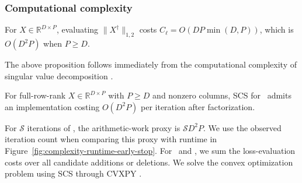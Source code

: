 \subsubsection{Computational complexity}

\begin{proposition}
\label{prop:pseudoinverse_cost}
For $X\in\mathbb R^{D\times P}$, evaluating $\|X^\dagger\|_{1,2}$ costs $C_\ell=O(DP\min(D,P))$, which is $O(D^2P)$ when $P\geq D$.
\end{proposition}
The above proposition follows immediately from the computational complexity of singular value decomposition \citep{Liang2016-qb}.
\begin{proposition}
\label{prop:computational_complexity}
For full-row-rank $X\in\mathbb R^{D\times P}$ with $P\geq D$ and nonzero columns, SCS for \isometrypursuit~admits an implementation costing $O(D^2P)$ per iteration after factorization.
\end{proposition}

For $\mathcal S$ iterations of \isometrypursuit, the arithmetic-work proxy is $\mathcal S D^2P$.
We use the observed iteration count when comparing this proxy with runtime in Figure~\ref{fig:complexity-runtime-early-stop}.
For \greedy~and \backwardgreedy, we sum the loss-evaluation costs over all candidate additions or deletions.
We solve the convex optimization problem using SCS \citep{ocpb:16} through CVXPY \citep{diamond2016cvxpy, agrawal2018rewriting}.
